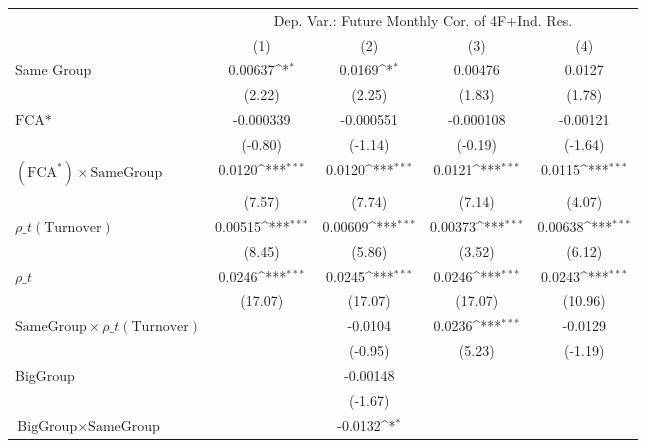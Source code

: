 {
\def\sym#1{\ifmmode^{#1}\else\(^{#1}\)\fi}
\begin{tabular}{l*{4}{c}}
\hline\hline
                &\multicolumn{4}{c}{Dep. Var.: Future Monthly Cor.  of 4F+Ind. Res.}        \\\cmidrule(lr){2-5}
                &\multicolumn{1}{c}{(1)}         &\multicolumn{1}{c}{(2)}         &\multicolumn{1}{c}{(3)}         &\multicolumn{1}{c}{(4)}         \\
\hline
Same Group      &  0.00637\sym{*}  &   0.0169\sym{*}  &  0.00476         &   0.0127         \\
                &   (2.22)         &   (2.25)         &   (1.83)         &   (1.78)         \\
[1em]
$ \text{FCA*} $ &-0.000339         &-0.000551         &-0.000108         & -0.00121         \\
                &  (-0.80)         &  (-1.14)         &  (-0.19)         &  (-1.64)         \\
[1em]
 $ (\text{FCA}^*) \times {\text{SameGroup} }  $ &   0.0120\sym{***}&   0.0120\sym{***}&   0.0121\sym{***}&   0.0115\sym{***}\\
                &   (7.57)         &   (7.74)         &   (7.14)         &   (4.07)         \\
[1em]
 $ {\rho\_t(\text{Turnover})} $ &  0.00515\sym{***}&  0.00609\sym{***}&  0.00373\sym{***}&  0.00638\sym{***}\\
                &   (8.45)         &   (5.86)         &   (3.52)         &   (6.12)         \\
[1em]
 $ {\rho\_t} $   &   0.0246\sym{***}&   0.0245\sym{***}&   0.0246\sym{***}&   0.0243\sym{***}\\
                &  (17.07)         &  (17.07)         &  (17.07)         &  (10.96)         \\
[1em]
$ {\text{SameGroup} \times  {\rho\_t(\text{Turnover})} } $ &                  &  -0.0104         &   0.0236\sym{***}&  -0.0129         \\
                &                  &  (-0.95)         &   (5.23)         &  (-1.19)         \\
[1em]
BigGroup        &                  & -0.00148         &                  &                  \\
                &                  &  (-1.67)         &                  &                  \\
[1em]
$ {\text{BigGroup} } \times {\text{SameGroup} }  $ &                  &  -0.0132\sym{*}  &                  &                  \\

\end{tabular}}
